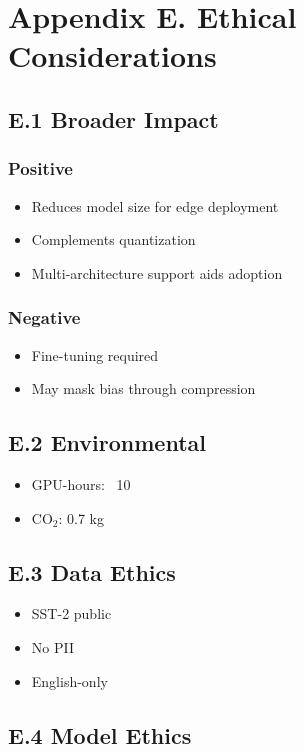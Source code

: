 \section{Appendix E. Ethical Considerations}

\subsection{E.1 Broader Impact}

\subsubsection{Positive}
\begin{itemize}
\item Reduces model size for edge deployment
\item Complements quantization
\item Multi-architecture support aids adoption

\end{itemize}
\subsubsection{Negative}
\begin{itemize}
\item Fine-tuning required
\item May mask bias through compression

\end{itemize}
\subsection{E.2 Environmental}

\begin{itemize}
\item GPU-hours: ~10
\item CO$_2$: 0.7 kg

\end{itemize}
\subsection{E.3 Data Ethics}

\begin{itemize}
\item SST-2 public
\item No PII
\item English-only

\end{itemize}
\subsection{E.4 Model Ethics}

